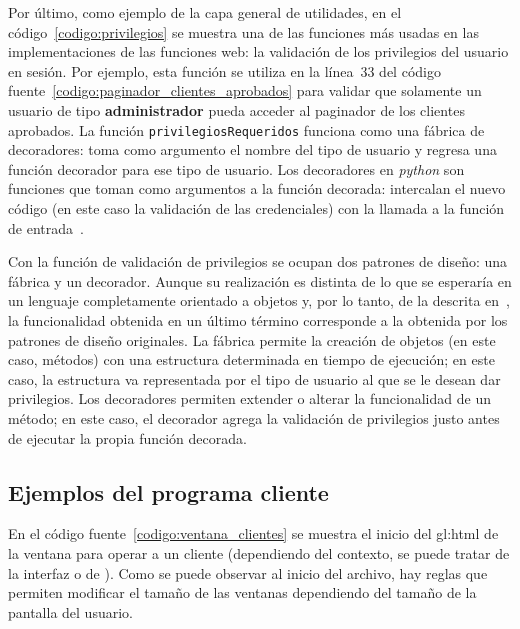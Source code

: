 Por último, como ejemplo de la capa general de utilidades, en el
código~\ref{codigo:privilegios} se muestra una de las funciones más usadas en
las implementaciones de las funciones web: la validación de los privilegios del
usuario en sesión. Por ejemplo, esta función se utiliza en la línea~33 del
código fuente~\ref{codigo:paginador_clientes_aprobados} para validar que
solamente un usuario de tipo \textbf{administrador} pueda acceder al paginador
de los clientes aprobados. La función \texttt{privilegiosRequeridos} funciona
como una fábrica de decoradores: toma como argumento el nombre del tipo de
usuario y regresa una función decorador para ese tipo de usuario. Los
decoradores en \textit{python} son funciones que toman como argumentos a la
función decorada: intercalan el nuevo código (en este caso la validación de las
credenciales) con la llamada a la función de entrada~\cite{python_decoradores}.

Con la función de validación de privilegios se ocupan dos patrones de diseño:
una fábrica y un decorador. Aunque su realización es distinta de lo que se
esperaría en un lenguaje completamente orientado a objetos y, por lo tanto, de
la descrita en~\cite{patrones_de_disenio}, la funcionalidad obtenida en un
último término corresponde a la obtenida por los patrones de diseño originales.
La fábrica permite la creación de objetos (en este caso, métodos) con una
estructura determinada en tiempo de ejecución; en este caso, la estructura va
representada por el tipo de usuario al que se le desean dar privilegios. Los
decoradores permiten extender o alterar la funcionalidad de un método; en este
caso, el decorador agrega la validación de privilegios justo antes de ejecutar
la propia función decorada.


\subsection{Ejemplos del programa cliente}

En el código fuente~\ref{codigo:ventana_clientes} se muestra el inicio del
\gls{gl:html} de la ventana para operar a un cliente (dependiendo del contexto,
se puede tratar de la interfaz  o de
). Como se puede observar al inicio del
archivo, hay reglas que permiten modificar el tamaño de las ventanas dependiendo
del tamaño de la pantalla del usuario.

